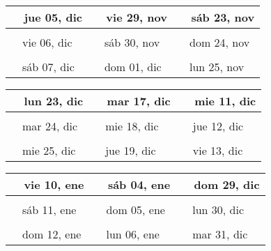 \documentclass[letterpaper,10pt]{article}
\begin{document}
\begin{tabular}{lll}
\\
{\ \ jue 05, dic\hspace{4.5cm}\vspace{2.25cm}} &{\ \ vie 29, nov\hspace{4.5cm}} &{\ \ sáb 23, nov\hspace{4.5cm}}
\\ \hline \\
{\ \ vie 06, dic\vspace{2.25cm}} & {\ \ sáb 30, nov} & {\ \ dom 24, nov}
\\ \hline \\
{\ \ sáb 07, dic\vspace{2.25cm}} & {\ \ dom 01, dic} & {\ \ lun 25, nov}
\\
\end{tabular}\par
\begin{tabular}{lll}
\\
{\ \ lun 23, dic\hspace{4.5cm}\vspace{2.25cm}} &{\ \ mar 17, dic\hspace{4.5cm}} &{\ \ mie 11, dic\hspace{4.5cm}}
\\ \hline \\
{\ \ mar 24, dic\vspace{2.25cm}} & {\ \ mie 18, dic} & {\ \ jue 12, dic}
\\ \hline \\
{\ \ mie 25, dic\vspace{2.25cm}} & {\ \ jue 19, dic} & {\ \ vie 13, dic}
\\
\end{tabular}\par
\begin{tabular}{lll}
\\
{\ \ vie 10, ene\hspace{4.5cm}\vspace{2.25cm}} &{\ \ sáb 04, ene\hspace{4.5cm}} &{\ \ dom 29, dic\hspace{4.5cm}}
\\ \hline \\
{\ \ sáb 11, ene\vspace{2.25cm}} & {\ \ dom 05, ene} & {\ \ lun 30, dic}
\\ \hline \\
{\ \ dom 12, ene\vspace{2.25cm}} & {\ \ lun 06, ene} & {\ \ mar 31, dic}
\\
\end{tabular}\par
\end{document}
